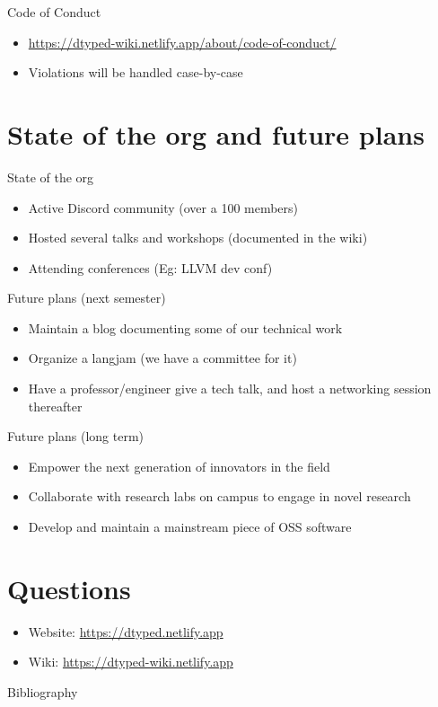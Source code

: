 \documentclass{beamer}
\begin{document}
\begin{frame}{Code of Conduct}
  \begin{itemize}
  \item \url{https://dtyped-wiki.netlify.app/about/code-of-conduct/}
  \item Violations will be handled case-by-case
  \end{itemize}
\end{frame}

\section{State of the org and future plans}

\begin{frame}{State of the org}
  \begin{itemize}
  \item Active Discord community (over a 100 members)
  \item Hosted several talks and workshops (documented in the wiki)
  \item Attending conferences (Eg: LLVM dev conf)
  \end{itemize}
\end{frame}

\begin{frame}{Future plans (next semester)}
  \begin{itemize}
  \item Maintain a blog documenting some of our technical work
  \item Organize a langjam (we have a committee for it)
  \item Have a professor/engineer give a tech talk, and host a networking session thereafter
  \end{itemize}
\end{frame}

\begin{frame}{Future plans (long term)}
  \begin{itemize}
  \item Empower the next generation of innovators in the field
  \item Collaborate with research labs on campus to engage in novel research
  \item Develop and maintain a mainstream piece of OSS software
  \end{itemize}
\end{frame}

\section{Questions}

\begin{frame}
  \begin{itemize}
  \item Website: \url{https://dtyped.netlify.app}
  \item Wiki: \url{https://dtyped-wiki.netlify.app}
  \end{itemize}
\end{frame}

\begin{frame}[allowframebreaks]{Bibliography}
\printbibliography
\end{frame}
\end{document}
